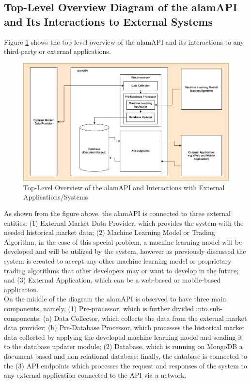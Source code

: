 \subsection{Top-Level Overview Diagram of the alamAPI and Its Interactions to External Systems}
\label{subsec:top_level_overview}

Figure \ref{fig:system_overview} shows the top-level overview of the 
alamAPI and its interactions to any third-party or external applications.

\begin{figure}[ht]
    \centering
    \includegraphics[width=1\textwidth]{./assets/SystemOverview.png}
    \caption{Top-Level Overview of the alamAPI and Interactions with External Applications/Systems}
    \label{fig:system_overview}
\end{figure}
\FloatBarrier

As shown from the figure above, the alamAPI is connected to three external 
entities: (1) External Market Data Provider, which provides the system with the 
needed historical market data; (2) Machine Learning Model or Trading Algorithm, 
in the case of this special problem, a machine learning model will be developed and 
will be utilized by the system, however as previously discussed the system is 
created to accept any other machine learning model or proprietary trading algorithms 
that other developers may or want to develop in the future; and 
(3) External Application, which can be a web-based or mobile-based application.
\vspace{0.5cm}
\\On the middle of the diagram the alamAPI is observed to have three main components, 
namely, (1) Pre-processor, which is further divided into sub-components: 
(a) Data Collector, which collects the data from the external market data provider; 
(b) Pre-Database Processor, which processes the historical market data collected by 
applying the developed machine learning model and sending it to the database updater 
module; (2) Database, which is running on MongoDB a document-based and non-relational 
database; finally, the database is connected to the (3) API endpoints which processes 
the request and responses of the system to any external application connected to the 
API via a network.